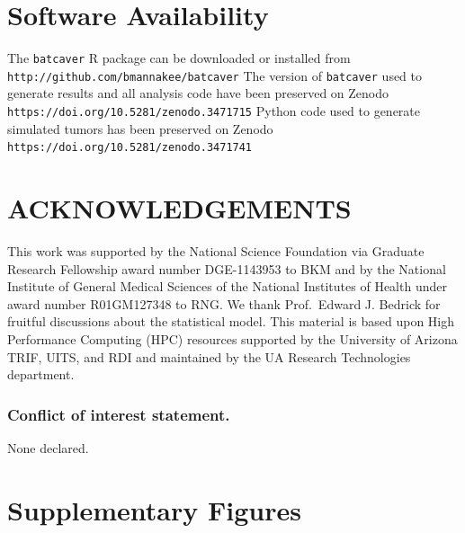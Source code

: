 \documentclass[a4,center,fleqn]{NAR}
\newcommand{\beginsupplement}{%
        \clearpage
        \onecolumn
        \setcounter{table}{0}
        \renewcommand{\thetable}{S\arabic{table}}%
        \setcounter{figure}{0}
        \renewcommand{\thefigure}{S\arabic{figure}}%
     }
\begin{document}
\section{Software Availability}

The \texttt{batcaver} R package can be downloaded or installed from \texttt{http://github.com/bmannakee/batcaver}
The version of \texttt{batcaver} used to generate results and all analysis code have been preserved on Zenodo \texttt{https://doi.org/10.5281/zenodo.3471715}
Python code used to generate simulated tumors has been preserved on Zenodo \texttt{https://doi.org/10.5281/zenodo.3471741}





\section{ACKNOWLEDGEMENTS}

This work was supported by the National Science Foundation via Graduate Research Fellowship award number DGE-1143953 to BKM and by the National Institute of General Medical Sciences of the National Institutes of Health under award number R01GM127348 to RNG.
We thank Prof.\ Edward J. Bedrick for fruitful discussions about the statistical model.
This material is based upon High Performance Computing (HPC) resources supported by the University of Arizona TRIF, UITS, and RDI and maintained by the UA Research Technologies department.

\subsubsection{Conflict of interest statement.} None declared.



\beginsupplement
\section{Supplementary Figures}
\end{document}
